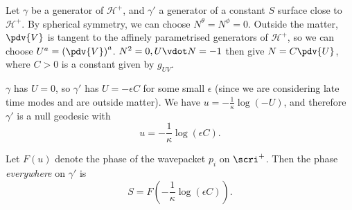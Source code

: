 \documentclass{jknotes}
\begin{document}
\begin{wrapfigure}{l}{0.5\linewidth}
    \centering
\end{wrapfigure}
Let \(\gamma\) be a generator of \(\mathcal{H}^+\), and \(\gamma'\) a generator of a constant \(S\) surface close to \(\mathcal{H}^+\). By spherical symmetry, we can choose \(N^\theta = N^\phi=0\). Outside the matter, \(\pdv{V}\) is tangent to the affinely parametrised generators of \(\mathcal{H}^+\), so we can choose \(U^a=\left(\pdv{V}\right)^a\). \(N^2=0,U\vdot N=-1\) then give \(N=C\pdv{U}\), where \(C>0\) is a constant given by \(g_{UV}\).

\(\gamma\) has \(U=0\), so \(\gamma'\) has \(U=-\epsilon C\) for some small \(\epsilon\) (since we are considering late time modes and are outside matter). We have \(u = - \frac{1}{\kappa}\log(-U)\), and therefore \(\gamma'\) is a null geodesic with
\begin{equation}
    u = - \frac{1}{\kappa}\log(\epsilon C).
\end{equation}

Let \(F(u)\) denote the phase of the wavepacket \(p_i\) on \(\scri^+\). Then the phase \emph{everywhere} on \(\gamma'\) is 
\begin{equation}
    S=F\left(-\frac{1}{\kappa}\log(\epsilon C)\right).
\end{equation}
\end{document}
